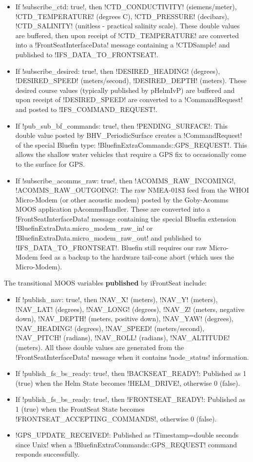 \begin{itemize}
\item If !subscribe_ctd: true!, then !CTD_CONDUCTIVITY! (siemens/meter), !CTD_TEMPERATURE! (degrees C), !CTD_PRESSURE! (decibars), !CTD_SALINITY! (unitless - practical salinity scale). These double values are buffered, then upon receipt of !CTD_TEMPERATURE! are converted into a !FrontSeatInterfaceData! message containing a !CTDSample! and published to !IFS_DATA_TO_FRONTSEAT!.
\item If !subscribe_desired: true!, then !DESIRED_HEADING! (degrees), !DESIRED_SPEED! (meters/second), !DESIRED_DEPTH! (meters). These desired course values (typically published by pHelmIvP) are buffered and upon receipt of !DESIRED_SPEED! are converted to a !CommandRequest! and posted to !IFS_COMMAND_REQUEST!.
\item If !pub_sub_bf_commands: true!, then !PENDING_SURFACE!: This double value posted by BHV\_PeriodicSurface creates a !CommandRequest! of the special Bluefin type: !BluefinExtraCommands::GPS_REQUEST!. This allows the shallow water vehicles that require a GPS fix to occasionally come to the surface for GPS.
\item If !subscribe_acomms_raw: true!, then !ACOMMS_RAW_INCOMING!, !ACOMMS_RAW_OUTGOING!: The raw NMEA-0183 feed from the WHOI Micro-Modem (or other acoustic modem) posted by the Goby-Acomms MOOS application pAcommsHandler. These are converted into a !FrontSeatInterfaceData! message containing the special Bluefin extension !BluefinExtraData.micro_modem_raw_in! or !BluefinExtraData.micro_modem_raw_out! and published to !IFS_DATA_TO_FRONTSEAT!. Bluefin still requires our raw Micro-Modem feed as a backup to the hardware tail-cone abort (which uses the Micro-Modem). 
\end{itemize}

The transitional MOOS variables \textbf{published} by iFrontSeat include:

\begin{itemize}
\item If !publish_nav: true!, then !NAV_X! (meters), !NAV_Y! (meters), !NAV_LAT! (degrees), !NAV_LONG! (degrees), !NAV_Z! (meters, negative down), !NAV_DEPTH! (meters, positive down), !NAV_YAW! (degrees), !NAV_HEADING! (degrees), !NAV_SPEED! (meters/second), !NAV_PITCH! (radians), !NAV_ROLL! (radians), !NAV_ALTITUDE! (meters). All these double values are generated from the !FrontSeatInterfaceData! message when it contains !node_status! information.
\item If !publish_fs_bs_ready: true!, then !BACKSEAT_READY!: Published as 1 (true) when the Helm State becomes !HELM_DRIVE!, otherwise 0 (false).
\item If !publish_fs_bs_ready: true!, then !FRONTSEAT_READY!: Published as 1 (true) when the FrontSeat State becomes !FRONTSEAT_ACCEPTING_COMMANDS!, otherwise 0 (false).
\item !GPS_UPDATE_RECEIVED!: Published as !Timestamp=double seconds since Unix! when a !BluefinExtraCommands::GPS_REQUEST! command responds successfully.
\end{itemize}

